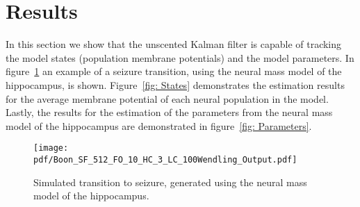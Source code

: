 %
%
%

\section{Results}

In this section we show that the unscented Kalman filter is capable of tracking the model states (population membrane potentials) and the model parameters. In figure~\ref{fig: Sim} an example of a seizure transition, using the neural mass model of the hippocampus, is shown. Figure~\ref{fig: States} demonstrates the estimation results for the average membrane potential of each neural population in the model. Lastly, the results for the estimation of the parameters from the neural mass model of the hippocampus are demonstrated in figure~\ref{fig: Parameters}.

\begin{figure}
	\centering
		\texttt{[image: pdf/Boon\_SF\_512\_FO\_10\_HC\_3\_LC\_100Wendling\_Output.pdf]}
			\caption{Simulated transition to seizure, generated using the neural mass model of the hippocampus.}
	\label{fig: Sim}
\end{figure}

